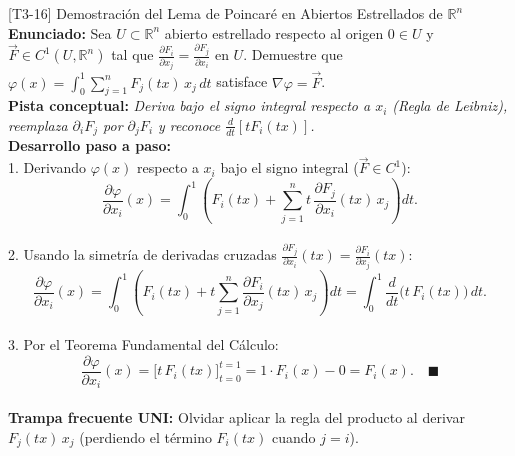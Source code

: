 \documentclass[11pt,a4paper]{article}
\begin{document}
\begin{ejerciciobox}{[T3-16] Demostración del Lema de Poincaré en Abiertos Estrellados de $\mathbb{R}^n$}
\textbf{Enunciado:} Sea $U \subset \mathbb{R}^n$ abierto estrellado respecto al origen $0 \in U$ y $\vec{F} \in C^1(U, \mathbb{R}^n)$ tal que $\frac{\partial F_i}{\partial x_j} = \frac{\partial F_j}{\partial x_i}$ en $U$. Demuestre que $\varphi(x) = \int_0^1 \sum_{j=1}^n F_j(tx)\,x_j\,dt$ satisface $\nabla\varphi = \vec{F}$.\\[0.2cm]
\textbf{Pista conceptual:} \emph{Deriva bajo el signo integral respecto a $x_i$ (Regla de Leibniz), reemplaza $\partial_i F_j$ por $\partial_j F_i$ y reconoce $\frac{d}{dt}[t F_i(tx)]$.}\\[0.2cm]
\textbf{Desarrollo paso a paso:}\\
1. Derivando $\varphi(x)$ respecto a $x_i$ bajo el signo integral ($\vec{F} \in C^1$):\\
$$\frac{\partial\varphi}{\partial x_i}(x) = \int_0^1 \left( F_i(tx) + \sum_{j=1}^n t\,\frac{\partial F_j}{\partial x_i}(tx)\,x_j \right)dt.$$\\
2. Usando la simetría de derivadas cruzadas $\frac{\partial F_j}{\partial x_i}(tx) = \frac{\partial F_i}{\partial x_j}(tx)$:\\
$$\frac{\partial\varphi}{\partial x_i}(x) = \int_0^1 \left( F_i(tx) + t\sum_{j=1}^n \frac{\partial F_i}{\partial x_j}(tx)\,x_j \right)dt = \int_0^1 \frac{d}{dt}\Big( t\,F_i(tx) \Big)\,dt.$$\\
3. Por el Teorema Fundamental del Cálculo:\\
$$\frac{\partial\varphi}{\partial x_i}(x) = \Big[ t\,F_i(tx) \Big]_{t=0}^{t=1} = 1\cdot F_i(x) - 0 = F_i(x). \quad \blacksquare$$\\[0.2cm]
\textbf{Trampa frecuente UNI:} Olvidar aplicar la regla del producto al derivar $F_j(tx)\,x_j$ (perdiendo el término $F_i(tx)$ cuando $j = i$).
\end{ejerciciobox}
\end{document}
